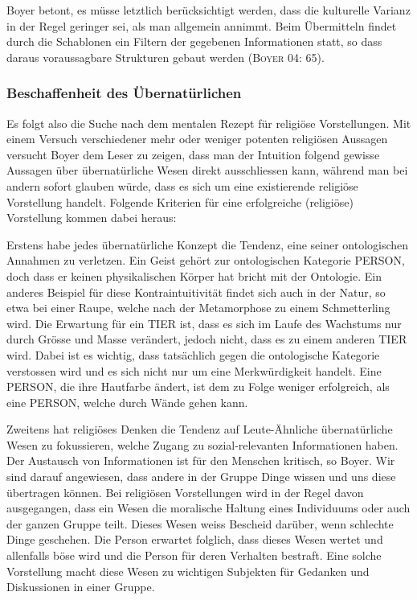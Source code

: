 Boyer betont, es müsse letztlich berücksichtigt werden, dass die kulturelle Varianz in der Regel geringer sei, als man allgemein annimmt. Beim Übermitteln findet durch die Schablonen ein Filtern der gegebenen Informationen statt, so dass daraus voraussagbare Strukturen gebaut werden (\textsc{Boyer 04: 65}).

\subsubsection{Beschaffenheit des Übernatürlichen}
Es folgt also die Suche nach dem mentalen Rezept für religiöse Vorstellungen. Mit einem Versuch verschiedener mehr oder weniger potenten religiösen Aussagen versucht Boyer dem Leser zu zeigen, dass man der Intuition folgend gewisse Aussagen über übernatürliche Wesen direkt ausschliessen kann, während man bei andern sofort glauben würde, dass es sich um eine existierende religiöse Vorstellung handelt. Folgende Kriterien für eine erfolgreiche (religiöse) Vorstellung kommen dabei heraus: 

Erstens habe jedes übernatürliche Konzept die Tendenz, eine seiner ontologischen Annahmen zu verletzen. Ein Geist gehört zur ontologischen Kategorie PERSON, doch dass er keinen physikalischen Körper hat bricht mit der Ontologie. Ein anderes Beispiel für diese Kontraintuitivität findet sich auch in der Natur, so etwa bei einer Raupe, welche nach der Metamorphose zu einem Schmetterling wird. Die Erwartung für ein TIER ist, dass es sich im Laufe des Wachstums nur durch Grösse und Masse verändert, jedoch nicht, dass es zu einem anderen TIER wird. Dabei ist es wichtig, dass tatsächlich gegen die ontologische Kategorie verstossen wird und es sich nicht nur um eine Merkwürdigkeit handelt. Eine PERSON, die ihre Hautfarbe ändert, ist dem zu Folge weniger erfolgreich, als eine PERSON, welche durch Wände gehen kann. 

Zweitens hat religiöses Denken die Tendenz auf Leute-Ähnliche übernatürliche Wesen zu fokussieren, welche Zugang zu sozial-relevanten Informationen haben. Der Austausch von Informationen ist für den Menschen kritisch, so Boyer. Wir sind darauf angewiesen, dass andere in der Gruppe Dinge wissen und uns diese übertragen können. Bei religiösen Vorstellungen wird in der Regel davon ausgegangen, dass ein Wesen die moralische Haltung eines Individuums oder auch der ganzen Gruppe teilt. Dieses Wesen weiss Bescheid darüber, wenn schlechte Dinge geschehen. Die Person erwartet folglich, dass dieses Wesen wertet und allenfalls böse wird und die Person für deren Verhalten bestraft. Eine solche Vorstellung macht diese Wesen zu wichtigen Subjekten für Gedanken und Diskussionen in einer Gruppe. 

